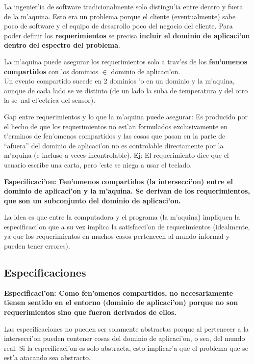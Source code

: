 \documentclass[a4paper,spanish]{article}
\newcommand{\tab}{\hspace*{1cm}}
\newcommand{\defi}[2]{\bfseries #1: \mdseries #2}
\begin{document}
La ingenier'ia de software tradicionalmente solo distingu'ia entre dentro y fuera de la m'aquina. Esto era un
problema porque el cliente (eventualmente) sabe poco de software y el equipo de desarrollo poco del negocio
del cliente. Para poder definir los \textbf{requerimientos} se precisa \textbf{incluir el dominio de
aplicaci'on dentro del espectro del problema}.

La m'aquina puede asegurar los requerimientos solo a trav'es de los \textbf{fen'omenos compartidos} con
los dominios $\in$ dominio de aplicaci'on. \\
\tab Un evento compartido sucede en 2 dominios 'o en un dominio y la m'aquina, aunque de cada lado se
ve distinto (de un lado la suba de temperatura y del otro la se~nal el'ectrica del sensor).

Gap entre requerimientos y lo que la m'aquina puede asegurar: Es producido por el hecho de que los requerimientos
no est'an formulados exclusivamente en t'erminos de fen'omenos compartidos y las cosas que pasan en la parte de
``afuera'' del dominio de aplicaci'on no es controlable directamente por la m'aquina (e incluso a veces 
incontrolable). Ej: El requerimiento dice que el usuario escribe una carta, pero 'este se niega a usar el teclado.

\defi{Especificaci'on}{Fen'omenos compartidos (la intersecci'on) entre el dominio de 
aplicaci'on y la m'aquina. Se derivan de los requerimientos, que son un subconjunto del dominio de
aplicaci'on.}

La idea es que entre la computadora y el programa (la m'aquina) impliquen la especificaci'on que a su
vez implica la satisfacci'on de requerimientos (idealmente, ya que los requerimientos en muchos casos
pertenecen al mundo informal y pueden tener errores).

\subsection{Especificaciones}

\defi{Especificaci'on}{Como fen'omenos compartidos, no necesariamente tienen sentido en el entorno
(dominio de aplicaci'on) porque \textbf{no son requerimientos} sino que fueron derivados de ellos.}

Las especificaciones no pueden ser solamente abstractas porque al pertenecer a la intersecci'on pueden
contener cosas del dominio de aplicaci'on, o sea, del mundo real. Si la especificaci'on es solo abstracta,
esto implicar'a que el problema que se est'a atacando sea abstracto.
\end{document}

